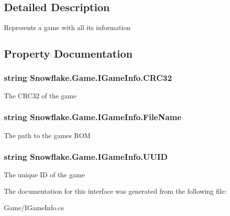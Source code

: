 \subsection{Detailed Description}
Represents a game with all it\textquotesingle{}s information 



\subsection{Property Documentation}
\hypertarget{interface_snowflake_1_1_game_1_1_i_game_info_a9a22682d66d9686ff4d64e83eb961624}{}
\subsubsection[{C\+R\+C32}]{\setlength{\rightskip}{0pt plus 5cm}string Snowflake.\+Game.\+I\+Game\+Info.\+C\+R\+C32\hspace{0.3cm}{\ttfamily [get]}}\label{interface_snowflake_1_1_game_1_1_i_game_info_a9a22682d66d9686ff4d64e83eb961624}


The C\+R\+C32 of the game 

\hypertarget{interface_snowflake_1_1_game_1_1_i_game_info_a9d47fb0690eb47f4bdf2e0e60afc4555}{}
\subsubsection[{File\+Name}]{\setlength{\rightskip}{0pt plus 5cm}string Snowflake.\+Game.\+I\+Game\+Info.\+File\+Name\hspace{0.3cm}{\ttfamily [get]}}\label{interface_snowflake_1_1_game_1_1_i_game_info_a9d47fb0690eb47f4bdf2e0e60afc4555}


The path to the game\textquotesingle{}s R\+O\+M 

\hypertarget{interface_snowflake_1_1_game_1_1_i_game_info_ad1ce0e9aece31e7b1f38f867177e7bee}{}
\subsubsection[{U\+U\+I\+D}]{\setlength{\rightskip}{0pt plus 5cm}string Snowflake.\+Game.\+I\+Game\+Info.\+U\+U\+I\+D\hspace{0.3cm}{\ttfamily [get]}}\label{interface_snowflake_1_1_game_1_1_i_game_info_ad1ce0e9aece31e7b1f38f867177e7bee}


The unique I\+D of the game 



The documentation for this interface was generated from the following file\+:\begin{DoxyCompactItemize}
\item 
Game/I\+Game\+Info.\+cs\end{DoxyCompactItemize}
